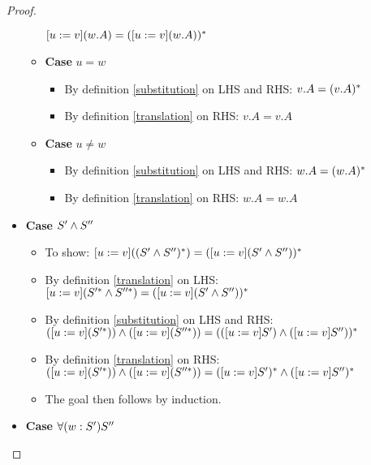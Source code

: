 \begin{proof}
\begin{itemize}
\begin{itemize}
                $[u := v](w.A) = ([u := v](w.A))^{*}$
            \item \textbf{Case} $u = w$
            \begin{itemize}
                \item By definition \ref{substitution} on LHS and RHS:
                    $v.A = (v.A)^{*}$
                \item By definition \ref{translation} on RHS: $v.A = v.A$
            \end{itemize}
            \item \textbf{Case} $u \neq w$
            \begin{itemize}
                \item By definition \ref{substitution} on LHS and RHS:
                    $w.A = (w.A)^{*}$
                \item By definition \ref{translation} on RHS: $w.A = w.A$
            \end{itemize}
        \end{itemize}
        \item \textbf{Case} $S' \wedge S''$
        \begin{itemize}
            \item To show: $[u := v]((S' \wedge S'')^{*}) =
                ([u := v](S' \wedge S''))^{*}$
            \item By definition \ref{translation} on LHS:
                $[u := v](S'^{*} \wedge S''^{*}) =
                ([u := v](S' \wedge S''))^{*}$
            \item By definition \ref{substitution} on LHS and RHS: \\
                $([u := v](S'^{*})) \wedge ([u := v](S''^{*}))
                = (([u := v]S') \wedge ([u := v]S''))^{*}$
            \item By definition \ref{translation} on RHS: \\
                $([u := v](S'^{*})) \wedge ([u := v](S''^{*}))
                = ([u := v]S')^{*} \wedge ([u := v]S'')^{*}$
            \item The goal then follows by induction.
        \end{itemize}
        \item \textbf{Case} $\forall(w:S')S''$
\end{itemize}
\end{proof}
